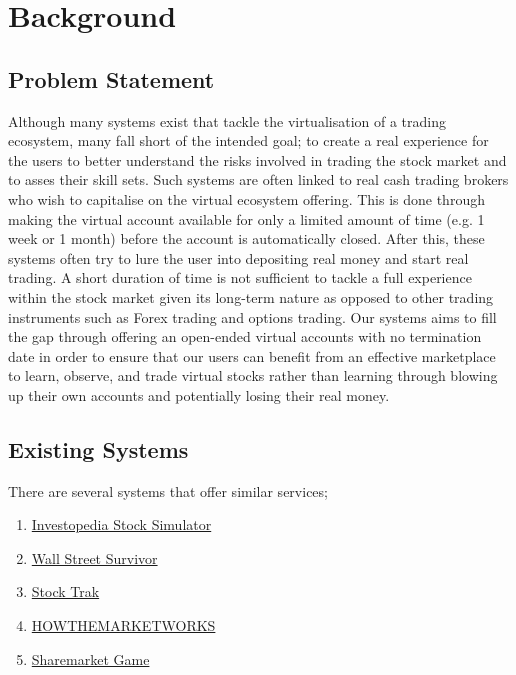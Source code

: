 

\section{Background}
    \label{sec:background}

\subsection{Problem Statement}
    \label{subsec:problem_statement}
    
Although many systems exist that tackle the virtualisation of a trading ecosystem, many fall short of the intended goal; to create a real experience for the users to better understand the risks involved in trading the stock market and to asses their skill sets. Such systems are often linked to real cash trading brokers who wish to capitalise on the virtual ecosystem offering. This is done through making the virtual account available for only a limited amount of time (e.g. 1 week or 1 month) before the account is automatically closed. After this, these systems often try to lure the user into depositing real money and start real trading. A short duration of time is not sufficient to tackle a full experience within the stock market given its long-term nature as opposed to other trading instruments such as Forex trading and options trading. Our systems aims to fill the gap through offering an open-ended virtual accounts with no termination date in order to ensure that our users can benefit from an effective marketplace to learn, observe, and trade virtual stocks rather than learning through blowing up their own accounts and potentially losing their real money.

\subsection{Existing Systems}
\label{subsec:existing_systems}
    
There are several systems that offer similar services; 
\begin{enumerate}
    \item \href{https://www.investopedia.com/simulator/portfolio/nogamestotradein.aspx}{Investopedia Stock Simulator}\label{alt:investop}
    \item \href{https://app.wallstreetsurvivor.com/}{Wall Street Survivor} \label{alt:wallst}
    \item \href{https://www.stocktrak.com/}{Stock Trak}\label{alt:stocktrak}
    \item \href{https://www.howthemarketworks.com/}{HOWTHEMARKETWORKS}\label{alt:howmarket}
    \item \href{https://www.asx.com.au/education/sharemarket-game.htm}{Sharemarket Game}\label{alt:sharegame}
\end{enumerate}

